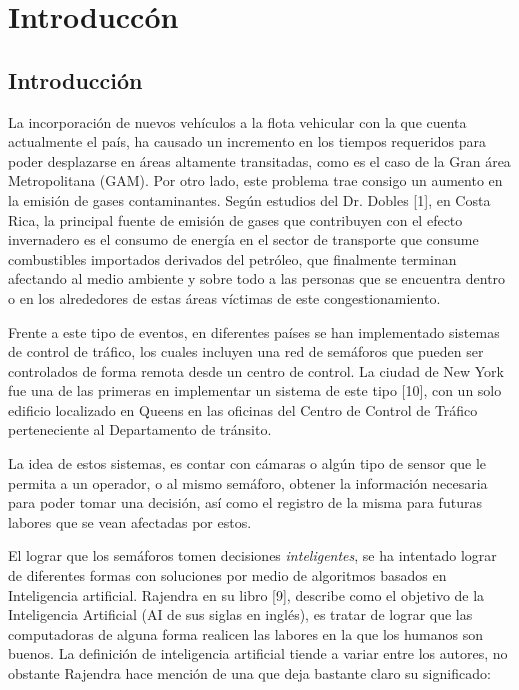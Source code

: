 \chapter{Introducc\'{o}n}
	\label{chap:introduction}
	
	\section{Introducci\'{o}n}

		 
		La incorporaci\'{o}n de nuevos veh\'{i}culos a la flota vehicular con la que cuenta
	actualmente el pa\'{i}s, ha causado un incremento en los tiempos requeridos para
	poder desplazarse en \'{a}reas altamente transitadas, como es el caso de la Gran
	\'{a}rea Metropolitana (GAM). Por otro lado, este problema trae consigo un aumento
	en la emisi\'{o}n de gases contaminantes. Seg\'{u}n estudios del Dr. Dobles [1], en Costa Rica, la principal fuente de emisi\'{o}n de gases que contribuyen con el efecto invernadero es el consumo de energ\'{i}a en el sector de transporte que consume combustibles importados derivados del petr\'{o}leo, que finalmente terminan afectando al medio ambiente y sobre todo a las personas que se encuentra dentro o en los alrededores de estas \'{a}reas v\'{i}ctimas de este congestionamiento.
	
		Frente a este tipo de eventos, en diferentes pa\'{i}ses se han implementado
	sistemas de control de tr\'{a}fico, los cuales incluyen una red de sem\'{a}foros que
	pueden ser controlados de forma remota desde un centro de control. La ciudad de
	New York fue una de las primeras en implementar un sistema de este tipo [10], con un solo edificio localizado en Queens en las oficinas del Centro de Control de Tr\'{a}fico perteneciente al Departamento de tr\'{a}nsito.
	
		La idea de estos sistemas, es contar con c\'{a}maras o alg\'{u}n tipo de sensor que le
	permita a un operador, o al mismo sem\'{a}foro, obtener la informaci\'{o}n necesaria
	para poder tomar una decisi\'{o}n, as\'{i} como el registro de la misma para futuras
	labores que se vean afectadas por estos.
	
		El lograr que los sem\'{a}foros tomen decisiones \textit{inteligentes}, se ha
	intentado lograr de diferentes formas con soluciones por medio de  algoritmos basados en Inteligencia
	artificial. Rajendra en su libro [9], describe como el objetivo de la
	Inteligencia Artificial (AI de sus siglas en ingl\'{e}s), es tratar de lograr que
	las computadoras de alguna forma realicen las labores en la que los humanos son
	buenos. La definici\'{o}n de inteligencia artificial tiende a variar entre los
	autores, no obstante Rajendra hace menci\'{o}n de una que deja bastante claro su significado:

